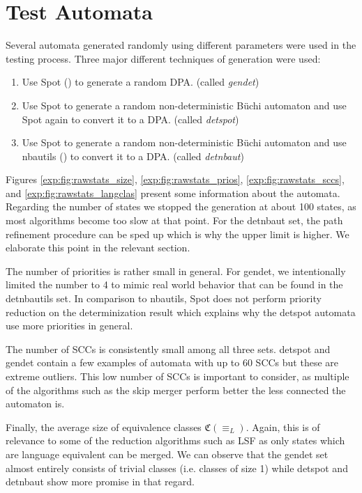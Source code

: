 



\section{Test Automata}
Several automata generated randomly using different parameters were used in the testing process. Three major different techniques of generation were used:

\begin{enumerate}
	\item Use Spot (\cite{}) to generate a random DPA. (called \emph{gendet})
	\item Use Spot to generate a random non-deterministic B\"uchi automaton and use Spot again to convert it to a DPA. (called \emph{detspot})
	\item Use Spot to generate a random non-deterministic B\"uchi automaton and use nbautils (\cite{}) to convert it to a DPA. (called \emph{detnbaut})
\end{enumerate}

Figures \ref{exp:fig:rawstats_size}, \ref{exp:fig:rawstats_prios}, \ref{exp:fig:rawstats_sccs}, and \ref{exp:fig:rawstats_langclas} present some information about the automata. Regarding the number of states we stopped the generation at about 100 states, as most algorithms become too slow at that point. For the detnbaut set, the path refinement procedure can be sped up which is why the upper limit is higher. We elaborate this point in the relevant section.

The number of priorities is rather small in general. For gendet, we intentionally limited the number to 4 to mimic real world behavior that can be found in the detnbautils set. In comparison to nbautils, Spot does not perform priority reduction on the determinization result which explains why the detspot automata use more priorities in general.

The number of SCCs is consistently small among all three sets. detspot and gendet contain a few examples of automata with up to 60 SCCs but these are extreme outliers. This low number of SCCs is important to consider, as multiple of the algorithms such as the skip merger perform better the less connected the automaton is.

Finally, the average size of equivalence classes $\mathfrak{C}(\equiv_L)$. Again, this is of relevance to some of the reduction algorithms such as LSF as only states which are language equivalent can be merged. We can observe that the gendet set almost entirely consists of trivial classes (i.e. classes of size 1) while detspot and detnbaut show more promise in that regard.


